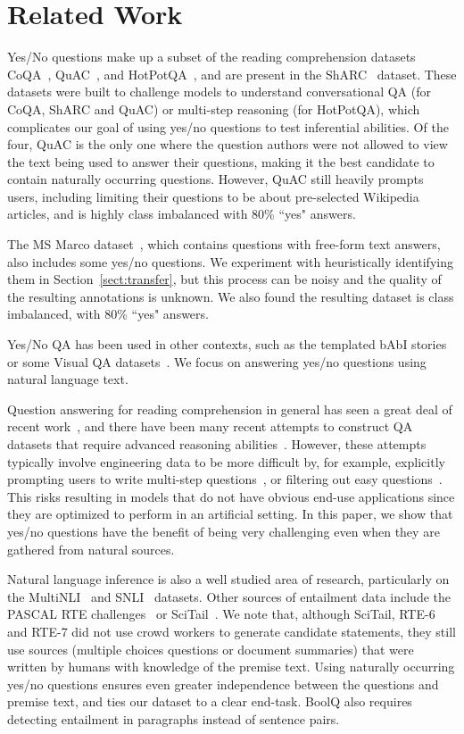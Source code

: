 \section{Related Work} Yes/No questions make up a subset of the reading comprehension datasets CoQA~\cite{coqa}, QuAC~\cite{quac}, and HotPotQA~\cite{hotpotqa}, and are present in the ShARC~\cite{sharc} dataset. These datasets were built to challenge models to understand conversational QA (for CoQA, ShARC and QuAC) or multi-step reasoning (for HotPotQA), which complicates our goal of using yes/no questions to test inferential abilities. Of the four, QuAC is the only one where the question authors were not allowed to view the text being used to answer their questions, making it the best candidate to contain naturally occurring questions. However, QuAC still heavily prompts users, including limiting their questions to be about pre-selected Wikipedia articles, and is highly class imbalanced with 80\% ``yes" answers.

The MS Marco dataset~\cite{msmarco}, which contains questions with free-form text answers, also includes some yes/no questions. We experiment with  heuristically identifying them in Section~\ref{sect:transfer}, but this process can be noisy and the quality of the resulting annotations is unknown. We also found the resulting dataset is class imbalanced, with 80\% ``yes" answers.

Yes/No QA has been used in other contexts, such as the templated bAbI stories~\cite{babi} or some Visual QA datasets~\cite{vqa, vqa_survey}. We focus on answering yes/no questions using natural language text.

Question answering for reading comprehension in general has seen a great deal of recent work~\cite{squad, triviaqa}, and there have been many recent attempts to construct QA datasets that require advanced reasoning abilities~\cite{hotpotqa, qangaroo, mihaylov2018can, swag, record}. However, these attempts typically involve engineering data to be more difficult by, for example, explicitly prompting users to write multi-step questions~\cite{hotpotqa, mihaylov2018can}, or filtering out easy questions~\cite{swag}. This risks resulting in models that do not have obvious end-use applications since they are optimized to perform in an artificial setting. In this paper, we show that yes/no questions have the benefit of being very challenging even when they are gathered from natural sources.

Natural language inference is also a well studied area of research, particularly on the MultiNLI~\cite{multinli} and SNLI~\cite{snli} datasets. Other sources of entailment data include the PASCAL RTE challenges~\cite{rte6, rte7} or SciTail~\cite{scitail}. We note that, although SciTail, RTE-6 and RTE-7 did not use crowd workers to generate candidate statements, they still use sources (multiple choices questions or document summaries) that were written by humans with knowledge of the premise text. Using naturally occurring yes/no questions ensures even greater independence between the questions and premise text, and ties our dataset to a clear end-task. BoolQ also requires detecting entailment in paragraphs instead of sentence pairs.

